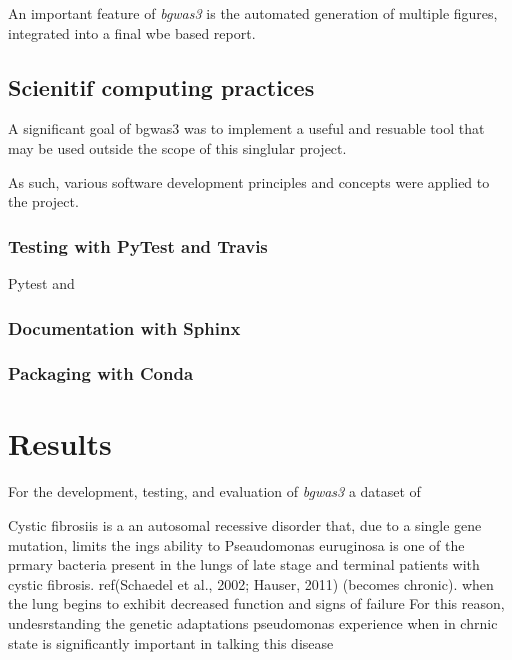 \documentclass[]{article}
\begin{document}
An important feature of \emph{bgwas3} is the automated generation of
multiple figures, integrated into a final wbe based report.

\hypertarget{scienitif-computing-practices}{%
\subsection{Scienitif computing
practices}\label{scienitif-computing-practices}}

A significant goal of bgwas3 was to implement a useful and resuable tool
that may be used outside the scope of this singlular project.

As such, various software development principles and concepts were
applied to the project.

\hypertarget{testing-with-pytest-and-travis}{%
\subsubsection{Testing with PyTest and
Travis}\label{testing-with-pytest-and-travis}}

Pytest and

\hypertarget{documentation-with-sphinx}{%
\subsubsection{Documentation with
Sphinx}\label{documentation-with-sphinx}}

\hypertarget{packaging-with-conda}{%
\subsubsection{Packaging with Conda}\label{packaging-with-conda}}

\hypertarget{results}{%
\section{Results}\label{results}}

For the development, testing, and evaluation of \emph{bgwas3} a dataset
of

Cystic fibrosiis is a an autosomal recessive disorder that, due to a
single gene mutation, limits the ings ability to Pseaudomonas euruginosa
is one of the prmary bacteria present in the lungs of late stage and
terminal patients with cystic fibrosis. ref(Schaedel et al., 2002;
Hauser, 2011) (becomes chronic). when the lung begins to exhibit
decreased function and signs of failure For this reason, undesrstanding
the genetic adaptations pseudomonas experience when in chrnic state is
significantly important in talking this disease
\end{document}
